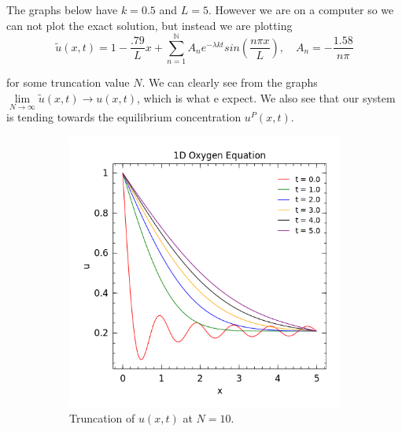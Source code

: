 \documentclass[12pt]{article}
\newcommand{\N}{\mathbb{N}}
\theoremstyle{remark}
\begin{document}
The graphs below have $k = 0.5$ and $L = 5$. However we are on a computer so we can not plot the exact solution, but instead we are plotting
$$ \tilde{u}(x,t) = 1 - \frac{.79}{L}x + \sum\limits_{n=1}^\N A_ne^{-\lambda kt}sin(\frac{n\pi x}{L}), \quad A_n = -\frac{1.58}{n\pi} $$

for some truncation value $N$. We can clearly see from the graphs $\lim\limits_{N\rightarrow\infty} \tilde{u}(x,t) \rightarrow u(x,t)$, which is what e expect. We also see that our system is tending towards the equilibrium concentration $u^P(x,t)$.

\pagebreak
\begin{figure}[H]
	\centering
	\begin{subfigure}{.5\textwidth}
		\centering
		\includegraphics[width=1\linewidth]{Q5_10.png}
		\caption*{Truncation of $u(x,t)$ at $N = 10$.}
		\label{fig:sub1}
	\end{subfigure}%
	\begin{subfigure}{.5\textwidth}
		\centering

\end{subfigure}
\end{figure}
\end{document}
